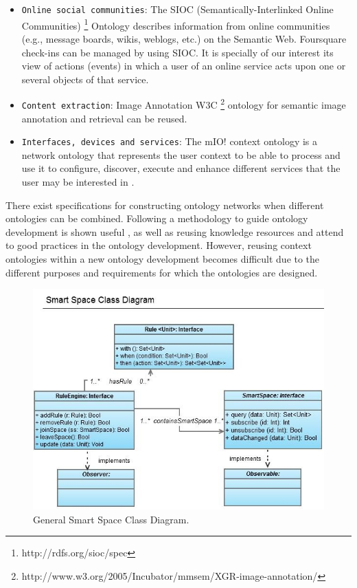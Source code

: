 \documentclass[[10pt,abbrv]{llncs}
\begin{document}
\begin{itemize}
\item  \verb+Online social communities+: The SIOC (Semantically-Interlinked Online Communities) \footnote{http://rdfs.org/sioc/spec} Ontology describes information from online communities (e.g., message boards, wikis, weblogs, etc.) on the Semantic Web. Foursquare check-ins can be managed by using SIOC. It is specially of our interest its view of actions (events) in which a user of an online service acts upon one or several objects of that service.
\item \verb+Content extraction+: Image Annotation W3C \footnote{http://www.w3.org/2005/Incubator/mmsem/XGR-image-annotation/} ontology for semantic image annotation and retrieval can be reused.
\item \verb+Interfaces, devices and services+: The mIO! context ontology is a network ontology that represents the user context to be able to process and use it to configure, discover, execute and enhance different services that the user may be interested in \cite{Poveda10}.
\end{itemize}

There exist specifications for constructing ontology networks \cite{Neon08} when different ontologies can be combined.
Following a methodology to guide ontology development is shown useful \cite{Poveda10}, as well as reusing knowledge resources and attend to good practices in the ontology development. However, reusing context ontologies within a new ontology development becomes difficult due to the different purposes and requirements for which the ontologies are designed.



\begin{figure}[tb]
\centering
\includegraphics[width=12cm]{images/SmartSpaceIndepArchitecture.jpg}
\caption{General Smart Space Class Diagram.}
\label{fig:SSSchema}
\end{figure}
\end{document}
